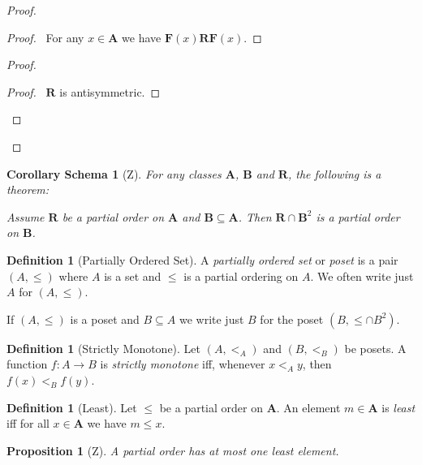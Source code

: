 \documentclass{book}
\let\qed\relax
\newtheorem{prop}[ax]{Proposition}
\newtheorem{cors}{Corollary Schema}[ax]
\theoremstyle{definition}
\newtheorem{df}[ax]{Definition}
\begin{document}
\begin{proof}
\pf
{}
\begin{proof}
	\pf\ For any $x \in \mathbf{A}$ we have $\mathbf{F}(x) \mathbf{R} \mathbf{F}(x)$.
\end{proof}
\begin{proof}
	\begin{proof}
		\pf\ $\mathbf{R}$ is antisymmetric.
	\end{proof}
\end{proof}
\qed
\end{proof}

\begin{cors}[Z]
\label{cor:subposet}
For any classes $\mathbf{A}$, $\mathbf{B}$ and $\mathbf{R}$, the following is a theorem:

Assume $\mathbf{R}$ be a partial order on $\mathbf{A}$ and $\mathbf{B} \subseteq \mathbf{A}$. Then $\mathbf{R} \cap \mathbf{B}^2$ is a partial order on $\mathbf{B}$.
\end{cors}

\begin{df}[Partially Ordered Set]
A \emph{partially ordered set} or \emph{poset} is a pair $(A, \leq)$ where $A$ is a set and $\leq$ is a partial ordering on $A$. We often write just $A$ for $(A, \leq)$.

If $(A, \leq)$ is a poset and $B \subseteq A$ we write just $B$ for the poset $(B, \leq \cap B^2)$.
\end{df}

\begin{df}[Strictly Monotone]
Let $(A,<_A)$ and $(B, <_B)$ be posets. A function $f : A \rightarrow B$ is \emph{strictly monotone} iff, whenever $x <_A y$, then $f(x) <_B f(y)$.
\end{df}

\begin{df}[Least]
Let $\leq$ be a partial order on $\mathbf{A}$. An element $m \in \mathbf{A}$ is \emph{least} iff for all $x \in \mathbf{A}$ we have $m \leq x$.
\end{df}

\begin{prop}[Z]
A partial order has at most one least element.
\end{prop}
\end{document}

